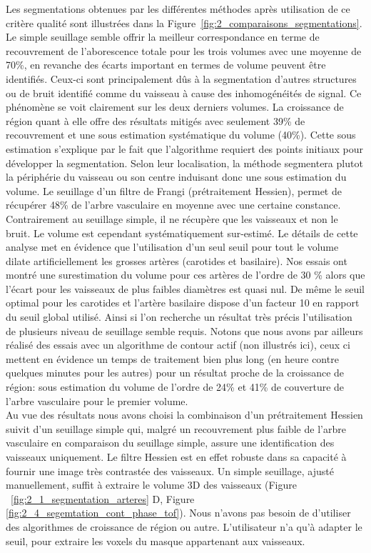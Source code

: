  Les segmentations obtenues par les différentes méthodes après utilisation de ce critère qualité sont illustrées dans la Figure~\ref{fig:2_comparaisons_segmentations}. Le simple seuillage semble offrir la meilleur correspondance en terme de recouvrement de l'aborescence totale pour les trois volumes avec une moyenne de 70\%, en revanche des écarts important en termes de volume peuvent être identifiés. Ceux-ci sont principalement dûs à la segmentation d'autres structures ou de bruit identifié comme du vaisseau à cause des inhomogénéités de signal. Ce phénomène se voit clairement sur les deux derniers volumes. La croissance de région quant à elle offre des résultats mitigés avec seulement 39\% de recouvrement et une sous estimation systématique du volume (40\%). Cette sous estimation s'explique par le fait que l'algorithme requiert des points initiaux pour développer la segmentation. Selon leur localisation, la méthode segmentera plutot la périphérie du vaisseau ou son centre induisant donc une sous estimation du volume. Le seuillage d'un filtre de Frangi (prétraitement Hessien), permet de récupérer 48\%  de l'arbre vasculaire en moyenne avec une certaine constance. Contrairement au seuillage simple, il ne récupère que les vaisseaux et non le bruit. Le volume est cependant systématiquement sur-estimé. Le détails de cette analyse met en évidence que l'utilisation d'un seul seuil pour tout le volume dilate artificiellement les grosses artères (carotides et basilaire). Nos essais ont montré une surestimation du volume pour ces artères de l'ordre de 30 \% alors que l'écart pour les vaisseaux de plus faibles diamètres est quasi nul. De même le seuil optimal pour les carotides et l'artère basilaire dispose d'un facteur 10 en rapport du seuil global utilisé. Ainsi si l'on recherche un résultat très précis l'utilisation de plusieurs niveau de seuillage semble requis. Notons que nous avons par ailleurs réalisé des essais avec un algorithme de contour actif (non illustrés ici), ceux ci mettent en évidence un temps de traitement bien plus long (en heure contre quelques minutes pour les autres) pour un résultat proche de la croissance de région: sous estimation du volume de l'ordre de 24\% et 41\% de couverture de l'arbre vasculaire pour le premier volume.\\

Au vue des résultats nous avons choisi la combinaison d’un prétraitement Hessien suivit d’un seuillage simple qui, malgré un recouvrement plus faible de l'arbre vasculaire en comparaison du seuillage simple, assure une identification des vaisseaux uniquement. Le filtre Hessien est en effet robuste dans sa capacité à fournir une image très contrastée des vaisseaux. Un simple seuillage, ajusté manuellement, suffit à extraire le volume 3D des vaisseaux (Figure ~\ref{fig:2_1_segmentation_arteres} D, Figure \ref{fig:2_4_segemtation_cont_phase_tof}). Nous n’avons pas besoin de d’utiliser des algorithmes de croissance de région ou autre. L’utilisateur n’a qu’à adapter le seuil, pour extraire les voxels du masque appartenant aux vaisseaux.  \\

